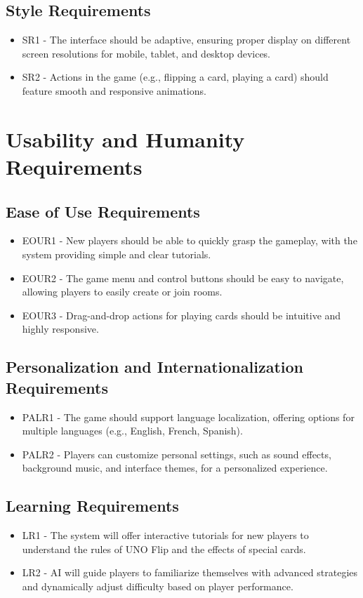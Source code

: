 \documentclass{article}
\begin{document}
\subsection{Style Requirements}
\begin{itemize}
    \item SR1 - The interface should be adaptive, ensuring proper display on different screen resolutions for mobile, tablet, and desktop devices.
    \item SR2 - Actions in the game (e.g., flipping a card, playing a card) should feature smooth and responsive animations.
\end{itemize}

\section{Usability and Humanity Requirements}

\subsection{Ease of Use Requirements}
\begin{itemize}
    \item EOUR1 - New players should be able to quickly grasp the gameplay, with the system providing simple and clear tutorials.
    \item EOUR2 - The game menu and control buttons should be easy to navigate, allowing players to easily create or join rooms.
    \item EOUR3 - Drag-and-drop actions for playing cards should be intuitive and highly responsive.
\end{itemize}

\subsection{Personalization and Internationalization Requirements}
\begin{itemize}
    \item PALR1 - The game should support language localization, offering options for multiple languages (e.g., English, French, Spanish).
    \item PALR2 - Players can customize personal settings, such as sound effects, background music, and interface themes, for a personalized experience.
\end{itemize}

\subsection{Learning Requirements}
\begin{itemize}
    \item LR1 - The system will offer interactive tutorials for new players to understand the rules of UNO Flip and the effects of special cards.
    \item LR2 - AI will guide players to familiarize themselves with advanced strategies and dynamically adjust difficulty based on player performance.
\end{itemize}
\end{document}
